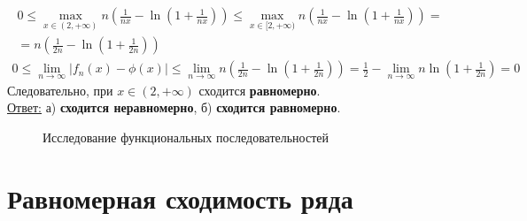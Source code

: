 \documentclass[a5paper, 10pt]{article}
\theoremstyle{definition}
\theoremstyle{plain}
\theoremstyle{remark}
\begin{document}
\begin{multline*}
0 \leq \max \limits_{x \in (2, + \infty) }  n \left( \frac{1}{nx}- \ln \left( 1+ \frac{1}{nx} \right)  \right) \leq \max \limits_{x \in [2, + \infty) }  n \left( \frac{1}{nx}- \ln \left( 1+ \frac{1}{nx} \right)  \right) =\\
=  n \left( \frac{1}{2n}- \ln \left( 1+ \frac{1}{2n} \right)  \right)
\end{multline*}
\begin{multline*}
0 \leq \lim_{n \to \infty} \left| f_n (x) - \phi(x)  \right| \leq \lim_{n \to \infty} n \left( \frac{1}{2n}- \ln \left( 1+ \frac{1}{2n} \right)  \right) =
 \frac{1}{2} - \lim_{n \to \infty} n \ln \left( 1+ \frac{1}{2n} \right)  = 0
\end{multline*}
Следовательно, при $x \in (2, + \infty)$ сходится \textbf{равномерно}.\\

\underline{Ответ:}  а) \textbf{ сходится неравномерно}, б) \textbf{сходится равномерно}.
\begin{figure}[h]
	           \caption{Исследование функциональных последовательностей}		
\end{figure}


\newpage
\section{Равномерная сходимость ряда}
\end{document}
